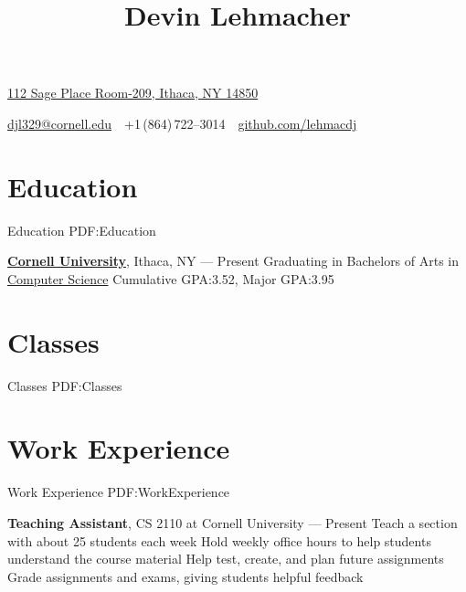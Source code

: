 \documentclass[letterpaper,10pt,oneside]{simpleresume}
\newcommand{\CVAuthor}{Devin Lehmacher}
\newcommand{\CVWebpage}{github.com/lehmacdj}
\begin{document}
\begin{minipage}[t][0pt]{\linewidth}
\pagestyle{empty}

\title{\CVAuthor}

\begin{subtitle}
\href{https://www.google.com/maps/place/112+Sage+Pl+Room-209,+Ithaca,+NY+14850}
{112 Sage Place Room-209, Ithaca, NY 14850}
\par
\href{mailto:djl329@cornell.edu}
{djl329@cornell.edu}
\,\SubBulletSymbol\,
+1\,(864)\,722--3014
\,\SubBulletSymbol\,
\href{https://\CVWebpage}
{\CVWebpage}
\end{subtitle}

\begin{body}

\section%
{Education}
{Education}
{PDF:Education}

\href{https://www.cornell.edu}
{\textbf{Cornell University}}, Ithaca, NY
\hfill
{} --- Present
\BulletItem%
Graduating in 
\BulletItem%
Bachelors of Arts in
\href{https://www.cs.cornell.edu}{Computer Science}
\BulletItem%
Cumulative GPA:\@ 3.52, Major GPA:\@ 3.95

\section%
{Classes}
{Classes}
{PDF:Classes}


\section%
{Work Experience}
{Work Experience}
{PDF:WorkExperience}

\textbf{Teaching Assistant}, CS 2110 at Cornell University
\hfill
{} --- Present
\BulletItem%
Teach a section with about 25 students each week
\BulletItem%
Hold weekly office hours to help students understand the course material
\BulletItem%
Help test, create, and plan future assignments
\BulletItem%
Grade assignments and exams, giving students helpful feedback


\end{body}
\end{minipage}
\end{document}
